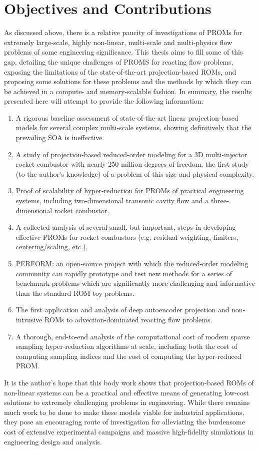 \section{Objectives and Contributions}

As discussed above, there is a relative paucity of investigations of PROMs for extremely large-scale, highly non-linear, multi-scale and multi-physics flow problems of some engineering significance. This thesis aims to fill some of this gap, detailing the unique challenges of PROMS for reacting flow problems, exposing the limitations of the state-of-the-art projection-based ROMs, and proposing some solutions for these problems and the methods by which they can be achieved in a compute- and memory-scalable fashion. In summary, the results presented here will attempt to provide the following information:

\begin{enumerate}
    \item A rigorous baseline assessment of state-of-the-art linear projection-based models for several complex multi-scale systems, showing definitively that the prevailing SOA is ineffective.
    \item A study of projection-based reduced-order modeling for a 3D multi-injector rocket combustor with nearly 250 million degrees of freedom, the first study (to the author's knowledge) of a problem of this size and physical complexity.
    \item Proof of scalability of hyper-reduction for PROMs of practical engineering systems, including two-dimensional transonic cavity flow and a three-dimensional rocket combustor.
    \item A collected analysis of several small, but important, steps in developing effective PROMs for rocket combustors (e.g. residual weighting, limiters, centering/scaling, etc.).
    \item PERFORM: an open-source project with which the reduced-order modeling community can rapidly prototype and test new methods for a series of benchmark problems which are significantly more challenging and informative than the standard ROM toy problems.
    \item The first application and analysis of deep autoencoder projection and non-intrusive ROMs to advection-dominated reacting flow problems.
    \item A thorough, end-to-end analysis of the computational cost of modern sparse sampling hyper-reduction algorithms at scale, including both the cost of computing sampling indices and the cost of computing the hyper-reduced PROM.
\end{enumerate}

It is the author's hope that this body work shows that projection-based ROMs of non-linear systems can be a practical and effective means of generating low-cost solutions to extremely challenging problems in engineering. While there remains much work to be done to make these models viable for industrial applications, they pose an encouraging route of investigation for alleviating the burdensome cost of extensive experimental campaigns and massive high-fidelity simulations in engineering design and analysis.